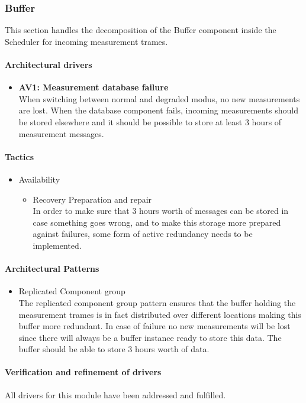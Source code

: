 \subsubsection{Buffer}
This section handles the decomposition of the Buffer component inside the Scheduler for incoming measurement trames.
\paragraph{Architectural drivers}
\begin{itemize}
	\item \textbf{AV1: Measurement database failure }\\
	When switching between normal and degraded modus, no new measurements are lost.
	When the database component fails, incoming measurements should be stored elsewhere and it should be possible to store at least 3 hours of measurement messages.
\end{itemize}
\paragraph{Tactics}
\begin{itemize}
	\item Availability
	\begin{itemize}
		\item Recovery Preparation and repair \\
		In order to make sure that 3 hours worth of messages can be stored in case something goes wrong, and to make this storage more prepared against failures, some form of active redundancy needs to be implemented.
	\end{itemize}
\end{itemize}
\paragraph{Architectural Patterns}
\begin{itemize}
	\item{Replicated Component group}\\
	The replicated component group pattern ensures that the buffer holding the measurement trames is in fact distributed over different locations making this buffer more redundant. In case of failure no new measurements will be lost since there will always be a buffer instance ready to store this data. The buffer should be able to store 3 hours worth of data. 
\end{itemize}


\paragraph{Verification and refinement of drivers}
All drivers for this module have been addressed and fulfilled.
